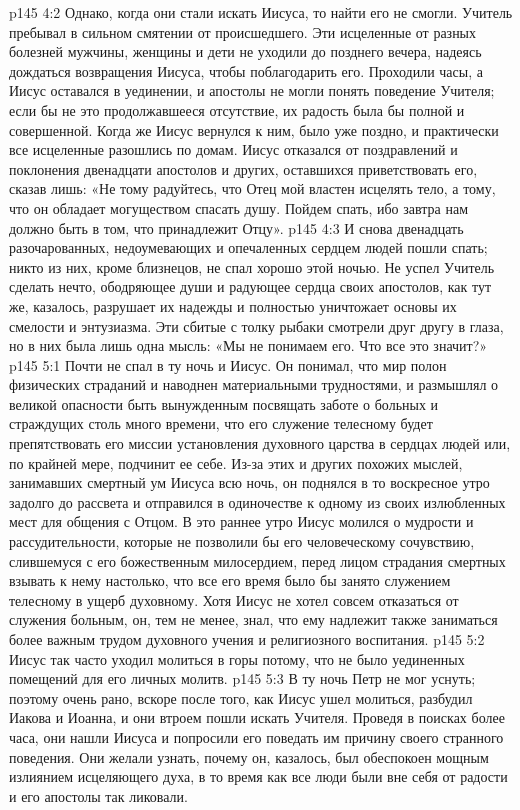 \enlargethispage{\baselineskip}%
\vs p145 4:2 Однако, когда они стали искать Иисуса, то найти его не смогли. Учитель пребывал в сильном смятении от происшедшего. Эти исцеленные от разных болезней мужчины, женщины и дети не уходили до позднего вечера, надеясь дождаться возвращения Иисуса, чтобы поблагодарить его. Проходили часы, а Иисус оставался в уединении, и апостолы не могли понять поведение Учителя; если бы не это продолжавшееся отсутствие, их радость была бы полной и совершенной. Когда же Иисус вернулся к ним, было уже поздно, и практически все исцеленные разошлись по домам. Иисус отказался от поздравлений и поклонения двенадцати апостолов и других, оставшихся приветствовать его, сказав лишь: «Не тому радуйтесь, что Отец мой властен исцелять тело, а тому, что он обладает могуществом спасать душу. Пойдем спать, ибо завтра нам должно быть в том, что принадлежит Отцу».
\vs p145 4:3 И снова двенадцать разочарованных, недоумевающих и опечаленных сердцем людей пошли спать; никто из них, кроме близнецов, не спал хорошо этой ночью. Не успел Учитель сделать нечто, ободряющее души и радующее сердца своих апостолов, как тут же, казалось, разрушает их надежды и полностью уничтожает основы их смелости и энтузиазма. Эти сбитые с толку рыбаки смотрели друг другу в глаза, но в них была лишь одна мысль: «Мы не понимаем его. Что все это значит?»
\vs p145 5:1 Почти не спал в ту ночь и Иисус. Он понимал, что мир полон физических страданий и наводнен материальными трудностями, и размышлял о великой опасности быть вынужденным посвящать заботе о больных и страждущих столь много времени, что его служение телесному будет препятствовать его миссии установления духовного царства в сердцах людей или, по крайней мере, подчинит ее себе. Из\hyp{}за этих и других похожих мыслей, занимавших смертный ум Иисуса всю ночь, он поднялся в то воскресное утро задолго до рассвета и отправился в одиночестве к одному из своих излюбленных мест для общения с Отцом. В это раннее утро Иисус молился о мудрости и рассудительности, которые не позволили бы его человеческому сочувствию, слившемуся с его божественным милосердием, перед лицом страдания смертных взывать к нему настолько, что все его время было бы занято служением телесному в ущерб духовному. Хотя Иисус не хотел совсем отказаться от служения больным, он, тем не менее, знал, что ему надлежит также заниматься более важным трудом духовного учения и религиозного воспитания.
\vs p145 5:2 Иисус так часто уходил молиться в горы потому, что не было уединенных помещений для его личных молитв.
\vs p145 5:3 В ту ночь Петр не мог уснуть; поэтому очень рано, вскоре после того, как Иисус ушел молиться, разбудил Иакова и Иоанна, и они втроем пошли искать Учителя. Проведя в поисках более часа, они нашли Иисуса и попросили его поведать им причину своего странного поведения. Они желали узнать, почему он, казалось, был обеспокоен мощным излиянием исцеляющего духа, в то время как все люди были вне себя от радости и его апостолы так ликовали.
